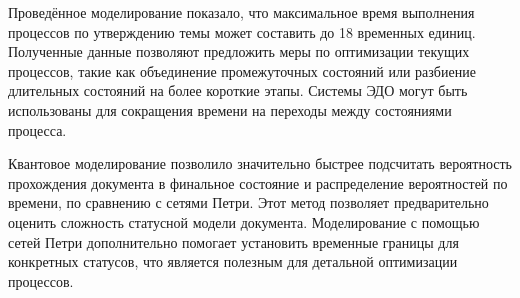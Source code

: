 {\par}

Проведённое моделирование показало, что максимальное время выполнения процессов по утверждению темы может составить до 18 временных единиц. Полученные данные позволяют предложить меры по оптимизации текущих процессов, такие как объединение промежуточных состояний или разбиение длительных состояний на более короткие этапы. Системы ЭДО могут быть использованы для сокращения времени на переходы между состояниями процесса.

Квантовое моделирование позволило значительно быстрее подсчитать вероятность прохождения документа в финальное состояние и распределение вероятностей по времени, по сравнению с сетями Петри. Этот метод позволяет предварительно оценить сложность статусной модели документа. Моделирование с помощью сетей Петри дополнительно помогает установить временные границы для конкретных статусов, что является полезным для детальной оптимизации процессов.

\clearpage